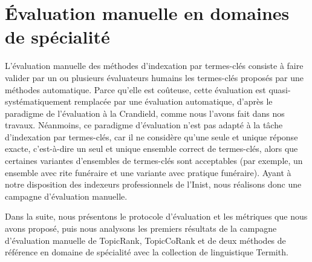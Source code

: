 
  \section{Évaluation manuelle en domaines de spécialité}
  \label{sec:main-domain_specific_keyphrase_annotation-manual_evaluation}
    L'évaluation manuelle des méthodes d'indexation par termes-clés consiste à
    faire valider par un ou plusieurs évaluateurs humains les termes-clés
    proposés par une méthodes automatique. Parce qu'elle est coûteuse, cette
    évaluation est quasi-systématiquement remplacée par une évaluation
    automatique, d'après le paradigme de l'évaluation \og{}à la Crandield\fg{},
    comme nous l'avons fait dans nos travaux. Néanmoins, ce paradigme
    d'évaluation n'est pas adapté à la tâche d'indexation par termes-clés, car
    il ne considère qu'une seule et unique réponse exacte, c'est-à-dire un seul
    et unique ensemble correct de termes-clés, alors que certaines variantes
    d'ensembles de termes-clés sont acceptables (par exemple, un ensemble avec
    \og{}rite funéraire\fg{} et une variante avec \og{}pratique funéraire\fg{}).
    Ayant à notre disposition des indexeurs professionnels de l'Inist, nous
    réalisons donc une campagne d'évaluation manuelle.

    Dans la suite, nous présentons le protocole d'évaluation et les métriques
    que nous avons proposé, puis nous analysons les premiers résultats de la
    campagne d'évaluation manuelle de TopicRank, TopicCoRank et de deux méthodes de référence en
    domaine de spécialité avec la collection de linguistique Termith.

